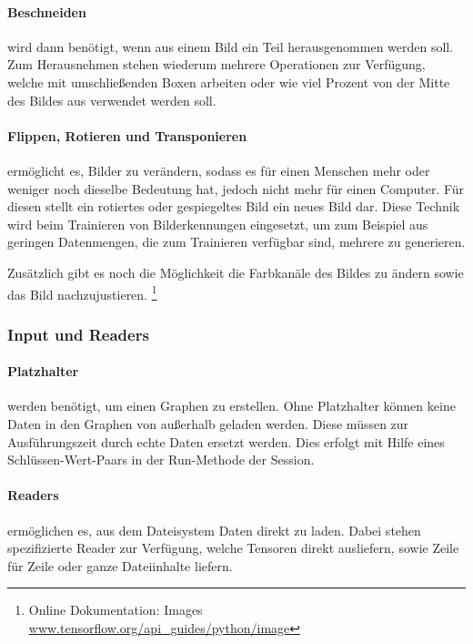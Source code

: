 \paragraph{Beschneiden} wird dann benötigt, wenn aus einem Bild ein Teil herausgenommen werden soll. 
Zum Herausnehmen stehen wiederum mehrere Operationen zur Verfügung, welche mit umschließenden Boxen arbeiten oder wie viel Prozent von der Mitte des Bildes aus verwendet werden soll.

\paragraph{Flippen, Rotieren und Transponieren} ermöglicht es, Bilder zu verändern, sodass es für einen Menschen mehr oder weniger noch dieselbe Bedeutung hat, jedoch nicht mehr für einen Computer. 
Für diesen stellt ein rotiertes oder gespiegeltes Bild ein neues Bild dar. 
Diese Technik wird beim Trainieren von Bilderkennungen eingesetzt, um zum Beispiel aus geringen Datenmengen, die zum Trainieren verfügbar sind, mehrere zu generieren.
\phantom \newline

\noindent
Zusätzlich gibt es noch die Möglichkeit die Farbkanäle des Bildes zu ändern sowie das Bild nachzujustieren. 
\footnote{Online Dokumentation: Images \url{www.tensorflow.org/api_guides/python/image}}

\subsubsection{Input und Readers}

\paragraph{Platzhalter} werden benötigt, um einen Graphen zu erstellen. 
Ohne Platzhalter können keine Daten in den Graphen von außerhalb geladen werden. 
Diese müssen zur Ausführungszeit durch echte Daten ersetzt werden. 
Dies erfolgt mit Hilfe eines Schlüssen-Wert-Paars in der Run-Methode der Session. 

\paragraph{Readers} ermöglichen es, aus dem Dateisystem Daten direkt zu laden. 
Dabei stehen spezifizierte Reader zur Verfügung, welche Tensoren direkt ausliefern, sowie Zeile für Zeile  oder ganze Dateiinhalte liefern. 

